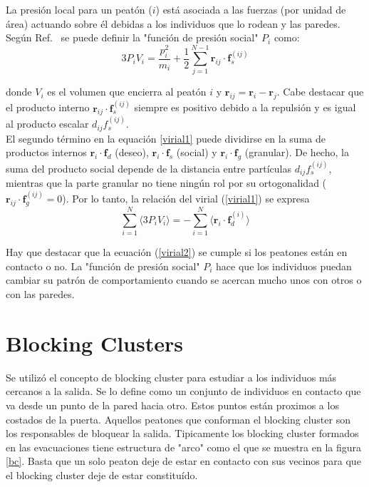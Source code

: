 La presión local para un peatón ($i$) está asociada a las fuerzas (por unidad de área) actuando sobre él debidas a los individuos que lo rodean y las paredes. Según Ref.~\cite{lion} se puede definir la "función de presión social" $P_i$ como:\\

\begin{equation}
3P_iV_i=\displaystyle\frac{p_i^2}{m_i} + \frac{1}{2}
\displaystyle\sum_{j=1}^{N-1}
\mathbf{r}_{ij}\cdot\mathbf{f}_s^{(ij)}\label{pv}
\end{equation}

\noindent donde $V_i$ es el volumen que encierra al peatón $i$ y 
$\mathbf{r}_{ij}=\mathbf{r}_{i}-\mathbf{r}_j$. Cabe destacar que el producto interno $\mathbf{r}_{ij}\cdot\mathbf{f}_s^{(ij)}$ siempre es positivo debido a la repulsión y es igual al producto escalar $d_{ij}f_s^{(ij)}$.  \\ 

El segundo término en la equación \ref{virial1} puede dividirse en la suma de productos internos $\mathbf{r}_i\cdot\mathbf{f}_d$ (deseo), 
$\mathbf{r}_i\cdot\mathbf{f}_s$ (social) y $\mathbf{r}_i\cdot\mathbf{f}_g$ (granular). De hecho, la suma del producto social depende de la distancia entre partículas $d_{ij}f_s^{(ij)}$, mientras que la parte granular no tiene ningún rol por su ortogonalidad ($\mathbf{r}_{ij}\cdot\mathbf{f}_g^{(ij)}=0$). Por lo tanto, la relación del virial (\ref{virial1}) se expresa \\  


\begin{equation}
 \displaystyle\sum_{i=1}^N\langle3P_iV_i 
\rangle=-\displaystyle\sum_{i=1}^N \langle
\mathbf{r}_i\cdot\mathbf{f}_d^{(i)}\rangle\label{virial2}
\end{equation}

Hay que destacar que la ecuación (\ref{virial2}) se cumple si los peatones están en contacto o no. La "función de presión social" $P_i$ hace que los individuos puedan cambiar su patrón de comportamiento cuando se acercan mucho unos con otros o con las paredes. \\ 


\section{Blocking Clusters}

Se utilizó el concepto de blocking cluster para estudiar a los individuos más cercanos a la salida. Se lo define como un conjunto de individuos en contacto que va desde un punto de la pared hacia otro. Estos puntos están proximos a los costados de la puerta. Aquellos peatones que conforman el blocking cluster son los responsables de bloquear la salida.  Tipicamente los blocking cluster formados en las evacuaciones tiene estructura de "arco" como el que se muestra en la figura \ref{bc}. Basta que un solo peaton deje de estar en contacto con sus vecinos para que el blocking cluster deje de estar constituído. \\

